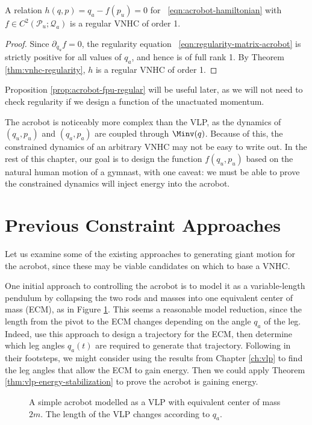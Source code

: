 \begin{prop}\label{prop:acrobot-fpu-regular}
    A relation \(h(q,p) = q_a - f(p_u) = 0\) for ~\eqref{eqn:acrobot-hamiltonian} 
    with \(f \in C^2\left(\mathcal{P}_u; \mathcal{Q}_a\right)\) is a regular
    VNHC of order 1.
\end{prop}
\begin{proof}
    Since \(\partial_{q_u} f = 0\), the regularity equation
    ~\eqref{eqn:regularity-matrix-acrobot} is strictly positive for all values
    of \(q_a\), and hence is of full rank 1.
    By Theorem \ref{thm:vnhc-regularity}, \(h\) is a regular VNHC of order 1.
\end{proof}
Proposition \ref{prop:acrobot-fpu-regular} will be useful later, as we will not
need to check regularity if we design a function of the unactuated momentum. 

The acrobot is noticeably more complex than the VLP, as
the dynamics of \((q_u,p_u)\) and \((q_a,p_a)\) are coupled through \(\Minv(q)\).
Because of this, the constrained dynamics of an arbitrary VNHC may not be easy
to write out.
In the rest of this chapter, our goal is to design the function \(f(q_u,p_u)\)
based on the natural human motion of a gymnast, with one caveat: 
we must be able to prove the constrained dynamics will inject energy into the
acrobot.

\section{Previous Constraint Approaches}
Let us examine some of the existing approaches to generating giant motion for
the acrobot, since these may be viable candidates on which to base a VNHC.

One initial approach to controlling the acrobot is to model it as a
variable-length pendulum by collapsing the two rods and masses into one
equivalent center of mass (ECM), as in Figure \ref{fig:acrobot-ecm}.
This seems a reasonable model reduction, since the length from the pivot to the
ECM changes depending on the angle \(q_a\) of the leg.
Indeed, \citet{swingup_giant_acrobot} use this approach to design a trajectory
for the ECM, then determine which leg angles \(q_a(t)\) are required to generate
that trajectory.
Following in their footsteps, we might consider using the results
from Chapter \ref{ch:vlp} to find the leg angles that allow the ECM to gain
energy. 
Then we could apply Theorem \ref{thm:vlp-energy-stabilization} to prove
the acrobot is gaining energy.
\begin{figure}
    \centering
    
    \caption{A simple acrobot modelled as a VLP with equivalent center of mass \(2m\). 
        The length of the VLP changes according to \(q_a\).}
    \label{fig:acrobot-ecm}
\end{figure}

